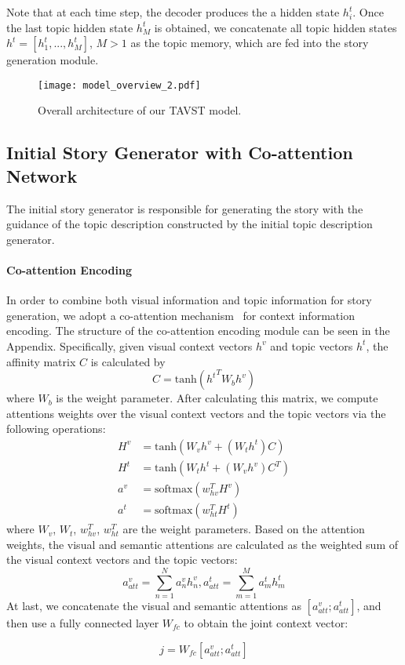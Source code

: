 \documentclass[11pt]{article}
\newcommand{\citep}{\cite}
\begin{document}
Note that at each time step, the decoder produces the a hidden state $h^t_i$. Once the last topic hidden state $h^t_M$ is obtained, we concatenate all topic hidden states $h^t=[h^t_1,...,h^t_M]$, $M > 1$ as the topic memory, which are fed into the story generation module. 



\begin{figure*} [!t]
\centering
  \texttt{[image: model\_overview\_2.pdf]}
  \caption{Overall architecture of our TAVST model. }
  \label{fig:over-view}
\end{figure*}

\subsection{Initial Story Generator with Co-attention Network}
\label{initial_story_generator}

The initial story generator is responsible for generating the story with the guidance of the topic description constructed by the initial topic description generator.

\paragraph{Co-attention Encoding}
In order to combine both visual information and topic information for story generation, we adopt a co-attention mechanism~\citep{Jing2018OnTA} for context information encoding. The structure of the co-attention encoding module can be seen in the Appendix. 
Specifically, given visual context vectors $h^v$ and topic vectors $h^t$, the affinity matrix $C$ is calculated by
{
\begin{equation}
C = \text{tanh}({h^t}^TW_{b}h^v) 
\end{equation}}where $W_b$ is the weight parameter. After calculating this matrix, we compute attentions weights over the visual context vectors and the topic vectors via the following operations:
{
\begin{equation}
\begin{split}
H^v &= \text{tanh}(W_vh^v+(W_th^t)C) \\
H^t &= \text{tanh}(W_th^t+(W_vh^v)C^T) \\
a^v &= \text{softmax}(w^T_{hv}H^v) \\
a^t &= \text{softmax}(w^T_{ht}H^t)
\end{split}
\end{equation}}where $W_v$, $W_t$, $w^T_{hv}$, $w^T_{ht}$ are the weight parameters. Based on the attention weights, the visual and semantic attentions are calculated as the weighted sum of the visual context vectors and the topic vectors:
{
\begin{equation}
a^v_{att} = \sum_{n=1}^N a^v_n h^v_n, a^t_{att} = \sum_{m=1}^M a^t_m h^t_m
\end{equation}
}
At last, we concatenate the visual and semantic attentions as $[a^v_{att};a^t_{att}]$, and then use a fully connected layer $W_{fc}$ to obtain the joint context vector:
{
\begin{equation}
 j = W_{fc}[a^v_{att};a^t_{att}]
\end{equation}

}
\end{document}
